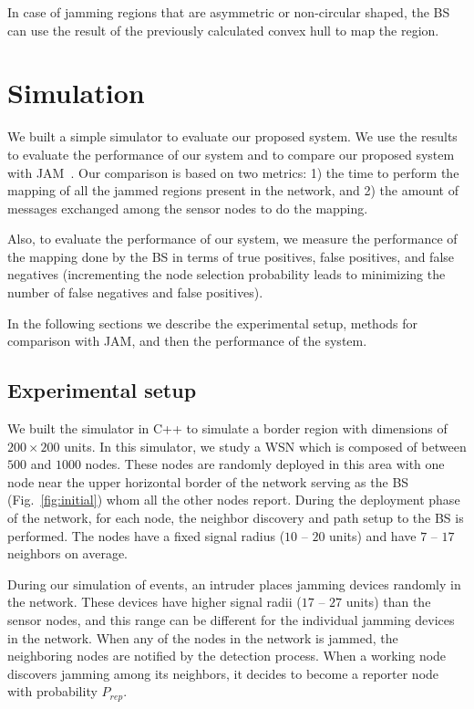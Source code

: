 \documentclass[conference]{IEEEtran}
\begin{document}
\noindent
In case of jamming regions that are asymmetric or non-circular shaped, the BS can use the result of the previously calculated convex hull to map the region.

\section{Simulation}
\label{sim}
We built a simple simulator to evaluate our proposed system. We use the results to evaluate the performance of our system and to compare our proposed system with JAM~\cite{JAM}. Our comparison is based on two metrics: 1) the time to perform the mapping of all the jammed regions present in the network, and 2) the amount of messages exchanged among the sensor nodes to do the mapping. 

Also, to evaluate the performance of our system, we measure the performance of the mapping done by the BS in terms of true positives, false positives, and false negatives (incrementing the node selection probability leads to minimizing the number of false negatives and false positives).  

In the following sections we describe the experimental setup, methods for comparison with JAM, and then the performance of the system.

\subsection{Experimental setup}
We built the simulator in C++ to simulate a border region with dimensions of $200 \times 200$ units. In this simulator, we study a WSN which is composed of between $500$ and $1000$ nodes. These nodes are randomly deployed in this area with one node near the upper horizontal border of the network serving as the BS (Fig.~\ref{fig:initial}) whom all the other nodes report. During the deployment phase of the network, for each node, the neighbor discovery and path setup to the BS is performed. The nodes have a fixed signal radius ($10$ -- $20$ units) and have $7$ -- $17$ neighbors on average.

During our simulation of events, an intruder places jamming devices randomly in the network. These devices have higher signal radii ($17$ -- $27$ units) than the sensor nodes, and this range can be different for the individual jamming devices in the network. When any of the nodes in the network is jammed, the neighboring nodes are notified by the detection process. When a working node discovers jamming among its neighbors, it decides to become a reporter node with probability $P_{rep}$.
\end{document}

